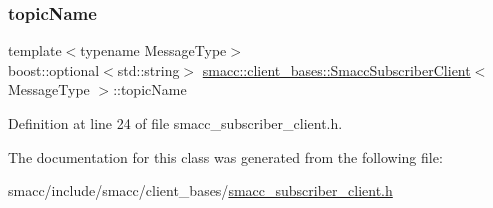 \subsubsection{\texorpdfstring{topic\+Name}{topicName}}
{\footnotesize\ttfamily template$<$typename Message\+Type$>$ \\
boost\+::optional$<$std\+::string$>$ \hyperlink{classsmacc_1_1client__bases_1_1SmaccSubscriberClient}{smacc\+::client\+\_\+bases\+::\+Smacc\+Subscriber\+Client}$<$ Message\+Type $>$\+::topic\+Name}



Definition at line 24 of file smacc\+\_\+subscriber\+\_\+client.\+h.



The documentation for this class was generated from the following file\+:\begin{DoxyCompactItemize}
\item 
smacc/include/smacc/client\+\_\+bases/\hyperlink{smacc__subscriber__client_8h}{smacc\+\_\+subscriber\+\_\+client.\+h}\end{DoxyCompactItemize}
